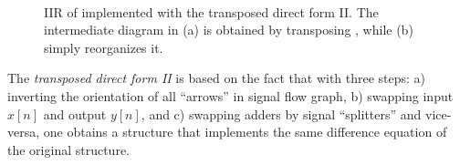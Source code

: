 \begin{figure}
\centering
\textrm{~~~~~~}    
  \caption{IIR of         implemented with the transposed direct form II. The intermediate diagram in (a) is obtained by transposing , while (b) simply reorganizes it.}
  \label{fig:iir_transposed}
\end{figure}

The \emph{transposed direct form II} is based on the fact that with three steps: a) inverting the orientation of all ``arrows'' in signal flow graph, b) swapping input $x[n]$ and output $y[n]$, and c) swapping adders by signal ``splitters'' and vice-versa, one obtains a structure that implements the same difference equation of the original structure.

